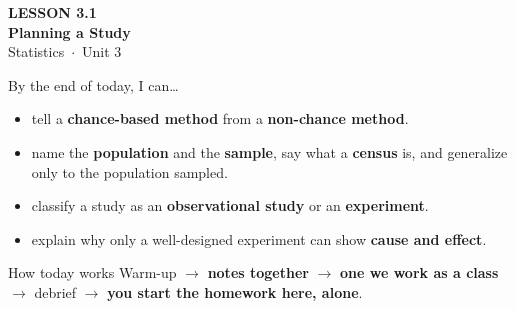 \documentclass[aspectratio=169, 11pt]{beamer}
\begin{document}
{
\begin{frame}[plain]
  \vspace{2.8cm}\hspace{0.55cm}%
  \begin{minipage}{0.9\textwidth}
    {\color{goldacc}\bfseries\small LESSON 3.1}\\[0.5cm]
    {\color{white}\bfseries\LARGE Planning a Study}\\[1.2cm]
    {\color{skymid}\small Statistics~$\cdot$~Unit 3}
  \end{minipage}
\end{frame}
}

\newcommand{\redink}[1]{{\color{redacc}\bfseries #1}}

\begin{frame}[t, plain]
  By the end of today, I can\ldots
  \begin{itemize}\setlength{\itemsep}{4pt}
    \item tell a \textbf{chance-based method} from a \textbf{non-chance method}.
    \item name the \textbf{population} and the \textbf{sample}, say what a \textbf{census} is,
          and generalize only to the population sampled.
    \item classify a study as an \textbf{observational study} or an \textbf{experiment}.
    \item explain why only a well-designed experiment can show \textbf{cause and effect}.
  \end{itemize}
  \begin{block}{How today works}
    Warm-up $\to$ \textbf{notes together} $\to$ \textbf{one we work as a class} $\to$
    debrief $\to$ \textbf{you start the homework here, alone}.
  \end{block}
\end{frame}
\end{document}
